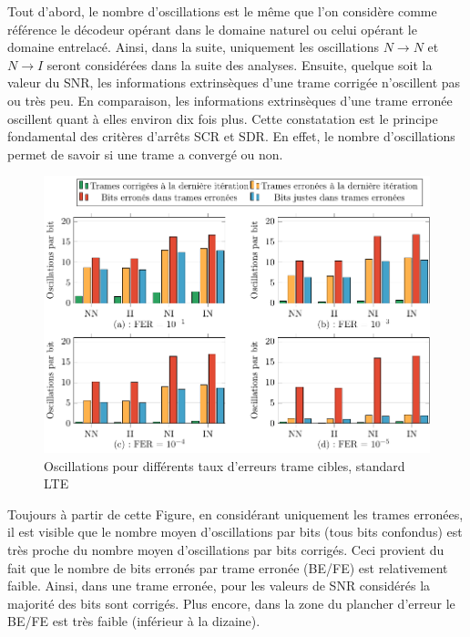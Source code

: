 Tout d'abord, le nombre d'oscillations est le même que l'on considère comme référence le décodeur opérant dans le 
domaine naturel ou celui opérant le domaine entrelacé. Ainsi, dans la suite, uniquement les oscillations $N\rightarrow N$ 
et $N\rightarrow I$ seront considérées dans la suite des analyses.
Ensuite, quelque soit la valeur du SNR, les informations extrinsèques d'une trame corrigée n'oscillent pas ou très 
peu. En comparaison, les informations extrinsèques d'une trame erronée oscillent quant à elles environ dix fois plus.
Cette constatation est le principe fondamental des critères d'arrêts SCR et SDR. En effet, le nombre d'oscillations 
permet de savoir si une trame a convergé ou non.

\begin{figure}[tb]
	\begin{center}
	\includegraphics[]{main/ch2_fig/tikz/m_lte.pdf}
	\caption{Oscillations pour différents taux d'erreurs trame cibles, standard LTE \label{ch2:fig:meanlte}}
	\end{center}
\end{figure}

Toujours à partir de cette Figure, en considérant uniquement les trames erronées, il est visible que le nombre moyen 
d’oscillations par bits (tous bits confondus) est très proche du nombre moyen d’oscillations par bits corrigés. Ceci 
provient du fait que le nombre de bits erronés par trame erronée (BE/FE) est relativement faible. Ainsi, dans une trame 
erronée, pour les valeurs de SNR considérés la majorité des bits sont corrigés. Plus encore, dans la zone du plancher 
d'erreur le BE/FE est très faible (inférieur à la dizaine).


